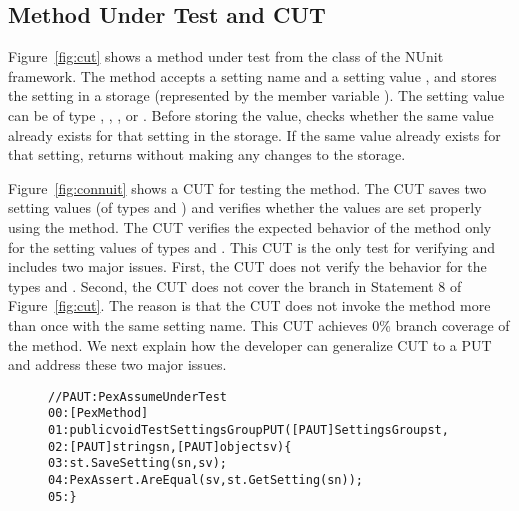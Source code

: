 \subsection{Method Under Test and CUT}

Figure~\ref{fig:cut} shows a method under test  from the  class of the NUnit framework. The  method accepts a setting name  and a setting value , and stores the setting in a storage (represented by the member variable ). The setting value can be of type , , , or . Before storing the value,  checks whether the same value already exists for that setting in the storage. If the same value already exists for that setting,  returns without making any changes to the storage.

Figure~\ref{fig:connuit} shows a CUT for testing the  method. The CUT saves two setting values (of types  and ) and verifies whether the values are set properly using the  method. The CUT verifies the expected behavior of the  method only for the setting values of types  and . This CUT is the only test for verifying  and includes two major issues. First, the CUT does not verify the behavior for the types  and . Second, the CUT does not cover the  branch in Statement 8 of Figure~\ref{fig:cut}. The reason is that the CUT does not invoke the  method more than once with the same setting name. This CUT achieves $0$\% branch coverage of the  method. We next explain how the developer can generalize CUT to a PUT and address these two major issues.

\begin{figure}[t]
\begin{CodeOut}
\begin{alltt}
//PAUT: PexAssumeUnderTest
00:[PexMethod]
01:public void TestSettingsGroupPUT([PAUT] SettingsGroup st, 
02:\hspace*{0.1in}[PAUT] string sn, [PAUT] object sv) \{
03:\hspace*{0.2in}st.SaveSetting(sn, sv);
04:\hspace*{0.2in}PexAssert.AreEqual(sv, st.GetSetting(sn));
05:\}
\end{alltt}
\end{CodeOut}\vspace*{-4ex}
\vspace*{-4ex}
\end{figure}
